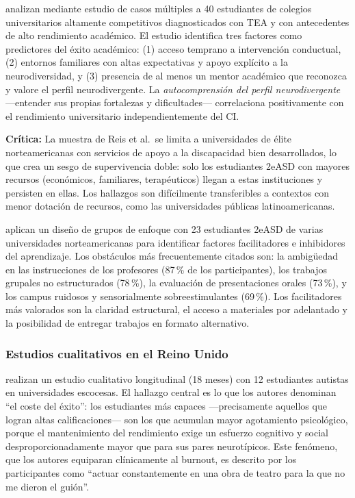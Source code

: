 \textcite{reis2021} analizan mediante estudio de casos múltiples a 40 estudiantes
de colegios universitarios altamente competitivos diagnosticados con TEA y con
antecedentes de alto rendimiento académico. El estudio identifica tres factores
como predictores del éxito académico: (1) acceso temprano a intervención
conductual, (2) entornos familiares con altas expectativas y apoyo explícito a
la neurodiversidad, y (3) presencia de al menos un mentor académico que reconozca
y valore el perfil neurodivergente. La \textit{autocomprensión del perfil
neurodivergente} —entender sus propias fortalezas y dificultades— correlaciona
positivamente con el rendimiento universitario independientemente del CI.

\textbf{Crítica:} La muestra de Reis et al.\ se limita a universidades de élite
norteamericanas con servicios de apoyo a la discapacidad bien desarrollados,
lo que crea un sesgo de supervivencia doble: solo los estudiantes 2eASD con
mayores recursos (económicos, familiares, terapéuticos) llegan a estas
instituciones y persisten en ellas. Los hallazgos son difícilmente transferibles
a contextos con menor dotación de recursos, como las universidades públicas
latinoamericanas.

\textcite{madaus2022factors} aplican un diseño de grupos de enfoque con 23 estudiantes
2eASD de varias universidades norteamericanas para identificar factores
facilitadores e inhibidores del aprendizaje. Los obstáculos más frecuentemente
citados son: la ambigüedad en las instrucciones de los profesores (87\,\% de los
participantes), los trabajos grupales no estructurados (78\,\%), la evaluación
de presentaciones orales (73\,\%), y los campus ruidosos y sensorialmente
sobreestimulantes (69\,\%). Los facilitadores más valorados son la claridad
estructural, el acceso a materiales por adelantado y la posibilidad de entregar
trabajos en formato alternativo.

\subsubsection{Estudios cualitativos en el Reino Unido}

\textcite{macleod2017} realizan un estudio cualitativo longitudinal (18 meses)
con 12 estudiantes autistas en universidades escocesas. El hallazgo central
es lo que los autores denominan ``el coste del éxito'': los estudiantes más
capaces —precisamente aquellos que logran altas calificaciones— son los que
acumulan mayor agotamiento psicológico, porque el mantenimiento del rendimiento
exige un esfuerzo cognitivo y social desproporcionadamente mayor que para sus
pares neurotípicos. Este fenómeno, que los autores equiparan clínicamente al
burnout, es descrito por los participantes como ``actuar constantemente en una
obra de teatro para la que no me dieron el guión''.

